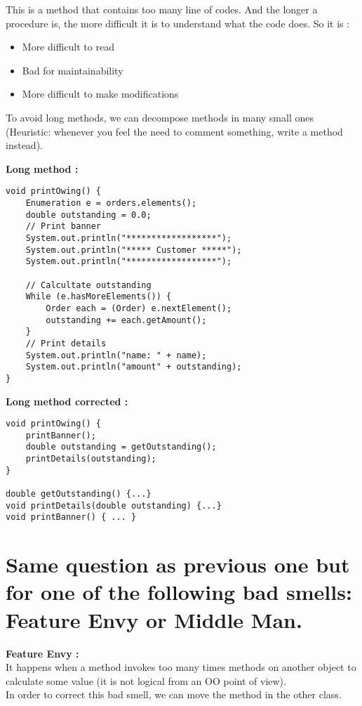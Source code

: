 This is a method that contains too many line of codes. And the longer a procedure is, the more difficult it is to understand what the code does. So it is :

\begin{itemize}
\item More difficult to read
\item Bad for maintainability
\item More difficult to make modifications
\end{itemize}

To avoid long methods,  we can decompose methods  in many small ones (Heuristic: whenever you feel the need to comment something, write a method instead).

\vspace{12pt}\textbf{Long method :}\\

\begin{lstlisting}
void printOwing() {
	Enumeration e = orders.elements(); 
	double outstanding = 0.0;
	// Print banner
	System.out.println("******************");
	System.out.println("***** Customer *****");
	System.out.println("******************");
    
	// Calcultate outstanding
	While (e.hasMoreElements()) {
		Order each = (Order) e.nextElement();
		outstanding += each.getAmount();
	}
	// Print details
	System.out.println("name: " + name);
	System.out.println("amount" + outstanding);
} 
\end{lstlisting} 
\vspace{12pt}\textbf{Long method corrected :}\\

\begin{lstlisting}
void printOwing() {
	printBanner();
	double outstanding = getOutstanding();
	printDetails(outstanding);
}

double getOutstanding() {...}
void printDetails(double outstanding) {...}
void printBanner() { ... }
\end{lstlisting}

\section{Same question as previous one but for one of the following bad smells:
Feature Envy or Middle Man.}

\textbf{Feature Envy :}\\
It happens when a method invokes too many times methods on another object to calculate some value (it is not logical from an OO point of view).\\
In order to correct this bad smell, we can move the method in the other class.\\

